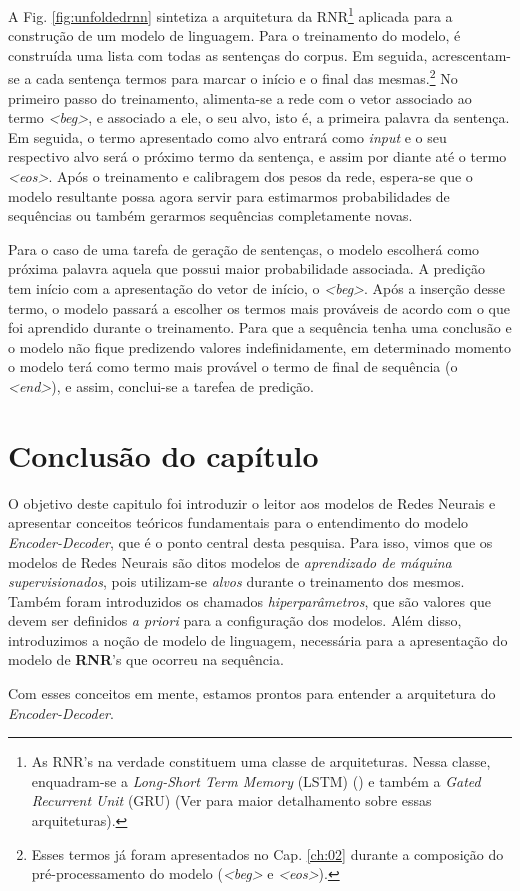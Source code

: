 A Fig. \ref{fig:unfoldedrnn} sintetiza a arquitetura da RNR\footnote{As RNR's na verdade constituem uma classe de arquiteturas. Nessa classe, enquadram-se a \textit{Long-Short Term Memory} (LSTM) (\cite{hochreiter:1997}) e também a \textit{Gated Recurrent Unit} (GRU) (Ver \cite{josh:2017} para maior detalhamento sobre essas arquiteturas).} aplicada para a construção de um modelo de linguagem. Para o treinamento do modelo, é construída uma lista com todas as sentenças do corpus. Em seguida, acrescentam-se a cada sentença termos para marcar o início e o final das mesmas.\footnote{Esses termos já foram apresentados no Cap. \ref{ch:02} durante a composição do pré-processamento do modelo (\textit{<beg>} e \textit{<eos>}).} No primeiro passo do treinamento, alimenta-se a rede com o vetor associado ao termo \textit{<beg>}, e associado a ele, o seu alvo, isto é, a primeira palavra da sentença. Em seguida, o termo apresentado como alvo entrará como \textit{input} e o seu respectivo alvo será o próximo termo da sentença, e assim por diante até o termo \textit{<eos>}. Após o treinamento e calibragem dos pesos da rede, espera-se que o modelo resultante possa agora servir para estimarmos probabilidades de sequências ou também gerarmos sequências completamente novas.

Para o caso de uma tarefa de geração de sentenças, o modelo escolherá como próxima palavra aquela que possui maior probabilidade associada. 
A predição tem início com a apresentação do vetor de início, o \textit{<beg>}. Após a inserção desse termo, o modelo passará a escolher os termos mais prováveis de acordo com o que foi aprendido durante o treinamento. Para que a sequência tenha uma conclusão e o modelo não fique predizendo valores indefinidamente, em determinado momento o modelo terá como termo mais provável o termo de final de sequência (o \textit{<end>}), e assim, conclui-se a tarefea de predição.  



\section{Conclusão do capítulo}

O objetivo deste capitulo foi introduzir o leitor aos modelos de Redes Neurais e apresentar conceitos teóricos fundamentais para o entendimento do modelo \textit{Encoder-Decoder}, que é o ponto central desta pesquisa. Para isso, vimos que os modelos de Redes Neurais são ditos modelos de \textit{aprendizado de máquina supervisionados}, pois utilizam-se \textit{alvos} durante o treinamento dos mesmos. Também foram introduzidos os chamados \textit{hiperparâmetros}, que são valores que devem ser definidos \textit{a priori} para a configuração dos modelos. Além disso, introduzimos a noção de modelo de linguagem, necessária para a apresentação do modelo de \textbf{RNR}'s que ocorreu na sequência. 

Com esses conceitos em mente, estamos prontos para entender a arquitetura do \textit{Encoder-Decoder}.

